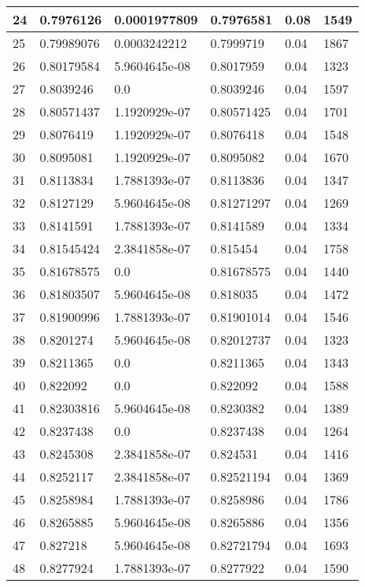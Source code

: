 \begin{longtable}{|l|l|l|l|l|l|}
24 & 0.7976126 & 0.0001977809 & 0.7976581 & 0.08 & 1549 \\ \hline 
25 & 0.79989076 & 0.0003242212 & 0.7999719 & 0.04 & 1867 \\ \hline 
26 & 0.80179584 & 5.9604645e-08 & 0.8017959 & 0.04 & 1323 \\ \hline 
27 & 0.8039246 & 0.0 & 0.8039246 & 0.04 & 1597 \\ \hline 
28 & 0.80571437 & 1.1920929e-07 & 0.80571425 & 0.04 & 1701 \\ \hline 
29 & 0.8076419 & 1.1920929e-07 & 0.8076418 & 0.04 & 1548 \\ \hline 
30 & 0.8095081 & 1.1920929e-07 & 0.8095082 & 0.04 & 1670 \\ \hline 
31 & 0.8113834 & 1.7881393e-07 & 0.8113836 & 0.04 & 1347 \\ \hline 
32 & 0.8127129 & 5.9604645e-08 & 0.81271297 & 0.04 & 1269 \\ \hline 
33 & 0.8141591 & 1.7881393e-07 & 0.8141589 & 0.04 & 1334 \\ \hline 
34 & 0.81545424 & 2.3841858e-07 & 0.815454 & 0.04 & 1758 \\ \hline 
35 & 0.81678575 & 0.0 & 0.81678575 & 0.04 & 1440 \\ \hline 
36 & 0.81803507 & 5.9604645e-08 & 0.818035 & 0.04 & 1472 \\ \hline 
37 & 0.81900996 & 1.7881393e-07 & 0.81901014 & 0.04 & 1546 \\ \hline 
38 & 0.8201274 & 5.9604645e-08 & 0.82012737 & 0.04 & 1323 \\ \hline 
39 & 0.8211365 & 0.0 & 0.8211365 & 0.04 & 1343 \\ \hline 
40 & 0.822092 & 0.0 & 0.822092 & 0.04 & 1588 \\ \hline 
41 & 0.82303816 & 5.9604645e-08 & 0.8230382 & 0.04 & 1389 \\ \hline 
42 & 0.8237438 & 0.0 & 0.8237438 & 0.04 & 1264 \\ \hline 
43 & 0.8245308 & 2.3841858e-07 & 0.824531 & 0.04 & 1416 \\ \hline 
44 & 0.8252117 & 2.3841858e-07 & 0.82521194 & 0.04 & 1369 \\ \hline 
45 & 0.8258984 & 1.7881393e-07 & 0.8258986 & 0.04 & 1786 \\ \hline 
46 & 0.8265885 & 5.9604645e-08 & 0.8265886 & 0.04 & 1356 \\ \hline 
47 & 0.827218 & 5.9604645e-08 & 0.82721794 & 0.04 & 1693 \\ \hline 
48 & 0.8277924 & 1.7881393e-07 & 0.8277922 & 0.04 & 1590 \\ \hline 

\end{longtable}
